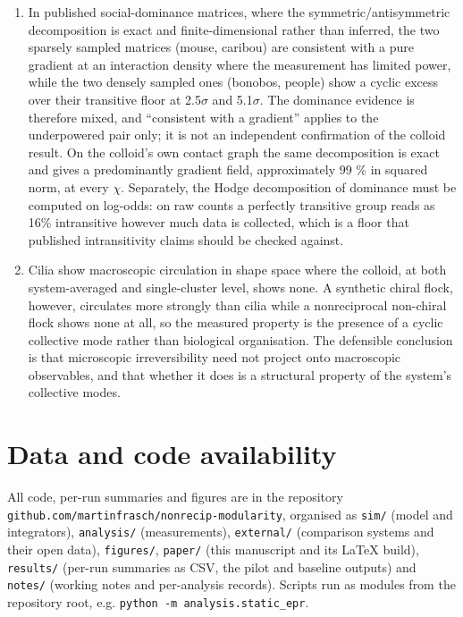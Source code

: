 \documentclass[aps,pre,preprint,superscriptaddress,nofootinbib,longbibliography]{revtex4-2}
\begin{document}
\begin{enumerate}
\item In published social-dominance matrices, where the symmetric/antisymmetric decomposition is exact and finite-dimensional rather than inferred, the two sparsely sampled matrices (mouse, caribou) are consistent with a pure gradient at an interaction density where the measurement has limited power, while the two densely sampled ones (bonobos, people) show a cyclic excess over their transitive floor at 2.5$\sigma$ and 5.1$\sigma$. The dominance evidence is therefore mixed, and ``consistent with a gradient'' applies to the underpowered pair only; it is not an independent confirmation of the colloid result. On the colloid's own contact graph the same decomposition is exact and gives a predominantly gradient field, approximately 99 \% in squared norm, at every $\chi$. Separately, the Hodge decomposition of dominance must be computed on log-odds: on raw counts a perfectly transitive group reads as 16\% intransitive however much data is collected, which is a floor that published intransitivity claims should be checked against.
\item Cilia show macroscopic circulation in shape space where the colloid, at both system-averaged and single-cluster level, shows none. A synthetic chiral flock, however, circulates more strongly than cilia while a nonreciprocal non-chiral flock shows none at all, so the measured property is the presence of a cyclic collective mode rather than biological organisation. The defensible conclusion is that microscopic irreversibility need not project onto macroscopic observables, and that whether it does is a structural property of the system's collective modes.
\end{enumerate}

\section{Data and code availability}

All code, per-run summaries and figures are in the repository \texttt{github.com/martinfrasch/nonrecip-modularity}, organised as \texttt{sim/} (model and integrators), \texttt{analysis/} (measurements), \texttt{external/} (comparison systems and their open data), \texttt{figures/}, \texttt{paper/} (this manuscript and its LaTeX build), \texttt{results/} (per-run summaries as CSV, the pilot and baseline outputs) and \texttt{notes/} (working notes and per-analysis records). Scripts run as modules from the repository root, e.g. \texttt{python -m analysis.static\_epr}.
\end{document}
